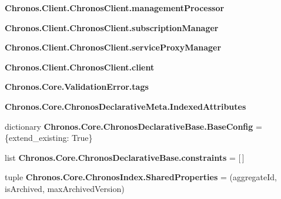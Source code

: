 \begin{DoxyCompactItemize}
\item 
{\bfseries Chronos.\+Client.\+Chronos\+Client.\+management\+Processor}\hypertarget{group__Chronos_ga4f2892cfea4888d0cc00a9df2094b4ff}{}\label{group__Chronos_ga4f2892cfea4888d0cc00a9df2094b4ff}

\item 
{\bfseries Chronos.\+Client.\+Chronos\+Client.\+subscription\+Manager}\hypertarget{group__Chronos_ga139df2194f077e457713b5a8d90d81a3}{}\label{group__Chronos_ga139df2194f077e457713b5a8d90d81a3}

\item 
{\bfseries Chronos.\+Client.\+Chronos\+Client.\+service\+Proxy\+Manager}\hypertarget{group__Chronos_ga7bb1ef517dc5c84ae9451bdda1528518}{}\label{group__Chronos_ga7bb1ef517dc5c84ae9451bdda1528518}

\item 
{\bfseries Chronos.\+Client.\+Chronos\+Client.\+client}\hypertarget{group__Chronos_ga9c95643bf9f9c84ddc7bf5b4c2b8461b}{}\label{group__Chronos_ga9c95643bf9f9c84ddc7bf5b4c2b8461b}

\item 
{\bfseries Chronos.\+Core.\+Validation\+Error.\+tags}\hypertarget{group__Chronos_gaa0f43d5b7215fc5351965a19666363ff}{}\label{group__Chronos_gaa0f43d5b7215fc5351965a19666363ff}

\item 
{\bfseries Chronos.\+Core.\+Chronos\+Declarative\+Meta.\+Indexed\+Attributes}\hypertarget{group__Chronos_ga68786902750ef90a3449dae3bf14df02}{}\label{group__Chronos_ga68786902750ef90a3449dae3bf14df02}

\item 
dictionary {\bfseries Chronos.\+Core.\+Chronos\+Declarative\+Base.\+Base\+Config} = \{\textquotesingle{}extend\+\_\+existing\textquotesingle{}\+: True\}\hypertarget{group__Chronos_ga12927f65f1412fb3ae0b64cecd3dbaa0}{}\label{group__Chronos_ga12927f65f1412fb3ae0b64cecd3dbaa0}

\item 
list {\bfseries Chronos.\+Core.\+Chronos\+Declarative\+Base.\+constraints} = \mbox{[}$\,$\mbox{]}\hypertarget{group__Chronos_ga61d8063662251552633c0c2eaae1bea7}{}\label{group__Chronos_ga61d8063662251552633c0c2eaae1bea7}

\item 
tuple {\bfseries Chronos.\+Core.\+Chronos\+Index.\+Shared\+Properties} = (\textquotesingle{}aggregate\+Id\textquotesingle{}, \textquotesingle{}is\+Archived\textquotesingle{}, \textquotesingle{}max\+Archived\+Version\textquotesingle{})\hypertarget{group__Chronos_ga1b87ff84accff0b73ac572fa37c312ce}{}\label{group__Chronos_ga1b87ff84accff0b73ac572fa37c312ce}


\end{DoxyCompactItemize}
